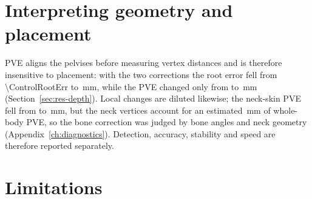 \section{Interpreting geometry and placement}
\label{sec:disc-pve}
\label{sec:disc-engineering}

PVE aligns the pelvises before measuring vertex distances and is therefore insensitive to placement: with the two
corrections the root error fell from \num{\ControlRootErr} to \FinalRootErr\,mm, while the PVE changed only from
\ControlPVE{} to \FinalPVE\,mm (Section~\ref{sec:res-depth}). Local changes are diluted likewise; the neck-skin PVE
fell from \ControlNeckSkin{} to \FinalNeckSkin\,mm, but the \DiscNeckVerts{} neck vertices account for an estimated
\DiscNeckPVEShare\,mm of whole-body PVE, so the bone correction was judged by bone angles and neck geometry
(Appendix~\ref{ch:diagnostics}). Detection, accuracy, stability and speed are therefore
reported separately.

\section{Limitations}
\label{sec:disc-limitations}

